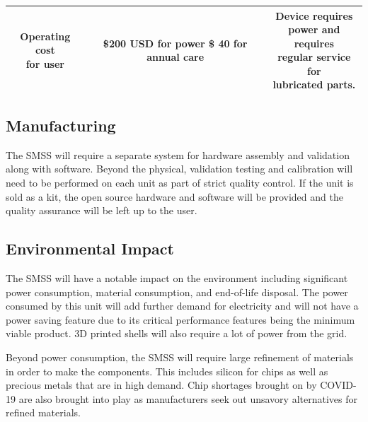 \documentclass[journal]{IEEEtran}
\begin{document}
\begin{table}[H]
\begin{center}
\begin{tabular}{|c|c|c|}
                            \makecell{Operating cost\\ for user}&
                            \makecell[l]{\$200 USD for power\\
                                         \$ 40 for annual care}&
                            \makecell[l]{Device requires \\
                                         power and requires\\
                                         regular service for\\
                                         lubricated parts.}
                                         
                            \\ \hline
                            
                            
                        \end{tabular}
                    \end{center}
                \end{table}
        
    
    \subsection{Manufacturing}
        The SMSS will require a separate system for hardware assembly and validation along with software. Beyond the physical, validation testing and calibration will need to be performed on each unit as part of strict quality control. If the unit is sold as a kit, the open source hardware and software will be provided and the quality assurance will be left up to the user.
    
    \subsection{Environmental Impact}
        The SMSS will have a notable impact on the environment including significant power consumption, material consumption, and end-of-life disposal. The power consumed by this unit will add further demand for electricity and will not have a power saving feature due to its critical performance features being the minimum viable product. 3D printed shells will also require a lot of power from the grid. 
        
        Beyond power consumption, the SMSS will require large refinement of materials in order to make the components. This includes silicon for chips as well as precious metals that are in high demand. Chip shortages brought on by COVID-19 are also brought into play as manufacturers seek out unsavory alternatives for refined materials.
        
\end{document}
